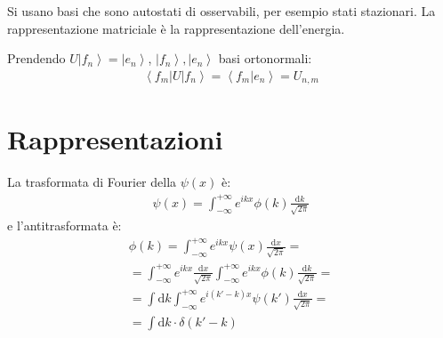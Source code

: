 Si usano basi che sono autostati di osservabili, per esempio stati stazionari. La rappresentazione matriciale è la rappresentazione dell'energia.

Prendendo $U\left |f_n \right\rangle=\left |e_n \right\rangle$, ${\left |f_n \right\rangle}, {\left |e_n \right\rangle}$ basi ortonormali:
\begin{equation}\begin{split}
\left\langle f_m|U|f_n \right\rangle=\left\langle f_m|e_n \right\rangle=U_{n,m}
\end{split}\end{equation}

\section{Rappresentazioni} %
La trasformata di Fourier della $\psi \left(x\right)$ è:
\begin{equation}\begin{split}
\psi \left(x\right)=\int_{-\infty }^{+\infty }{e^{ikx}\phi\left(k\right) \frac{\textrm{d}k}{\sqrt{2\pi}}}
\end{split}\end{equation}
e l'antitrasformata è:
\begin{equation}\begin{split}
\phi \left(k\right)=\int^{+\infty }_{-\infty }{e^{ikx}\psi \left(x\right) \frac{\textrm{d}x}{\sqrt{2\pi}}}=\\
=\int^{+\infty }_{-\infty }{e^{ikx}\frac{\textrm{d}x}{\sqrt{2\pi}}}\int_{-\infty }^{+\infty }{e^{ikx}\phi\left(k\right) \frac{\textrm{d}k}{\sqrt{2\pi}}}=\\
=\int{\textrm{d}k}\int^{+\infty }_{-\infty }{e^{i\left(k'-k\right)x}\psi \left(k'\right) \frac{\textrm{d}x}{\sqrt{2\pi}}}=\\
=\int{\textrm{d}k}\cdot \delta\left(k'-k\right)
\end{split}\end{equation}

